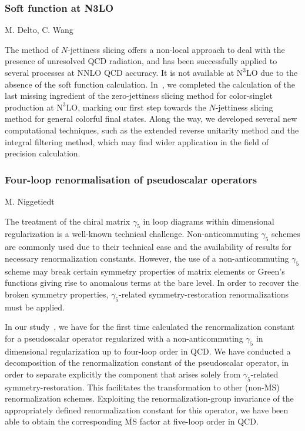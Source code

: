 \documentclass{FBR_Bericht_2025}
\begin{document}
\begin{refsection}
\subsubsection{Soft function at N3LO}
\begin{Namen}
M. Delto, C. Wang
\end{Namen}
%
The method of $N$-jettiness slicing offers a non-local approach to deal with the presence of unresolved QCD radiation, and has been successfully applied to several processes at NNLO QCD accuracy. It is not available at $\text{N}^{3}\text{LO}$ due to the absence of the soft function calculation.
In~\cite{Baranowski:2024ene,Baranowski:2024vxg,Baranowski:2024ysi}, we completed the calculation of the last missing ingredient of the zero-jettiness slicing method for color-singlet production at $\text{N}^{3}\text{LO}$, marking our first step towards the $N$-jettiness slicing method for general colorful final states.
Along the way, we developed several new computational techniques, such as the extended reverse unitarity method and the integral filtering method, which may find wider application in the field of precision calculation.
%
\subsubsection{Four-loop renormalisation of pseudoscalar operators}
\begin{Namen}
M. Niggetiedt
\end{Namen}
%
The treatment of the chiral matrix $\gamma_5$ in loop diagrams within dimensional regularization is a well-known technical challenge. Non-anticommuting $\gamma_5$ schemes are commonly used due to their technical ease and the availability of results for necessary renormalization constants. However, the use of a non-anticommuting $\gamma_5$ scheme may break certain symmetry properties of matrix elements or Green's functions giving rise to anomalous terms at the bare level. In order to recover the broken symmetry properties, $\gamma_5$-related symmetry-restoration renormalizations must be applied. 

In our study~\cite{Chen:2024cvu}, we have for the first time calculated the renormalization constant for a pseudoscalar operator regularized with a non-anticommuting $\gamma_5$ in dimensional regularization up to four-loop order in QCD. We have conducted a decomposition of the renormalization constant of the pseudoscalar operator, in order to separate explicitly the component that arises solely from $\gamma_5$-related symmetry-restoration. This facilitates the transformation to other (non-$\overline{\mathrm{MS}}$) renormalization schemes. Exploiting the renormalization-group invariance of the appropriately defined renormalization constant for this operator, we have been able to obtain the corresponding $\overline{\mathrm{MS}}$ factor at five-loop order in QCD. 
%

\end{refsection}
\end{document}
